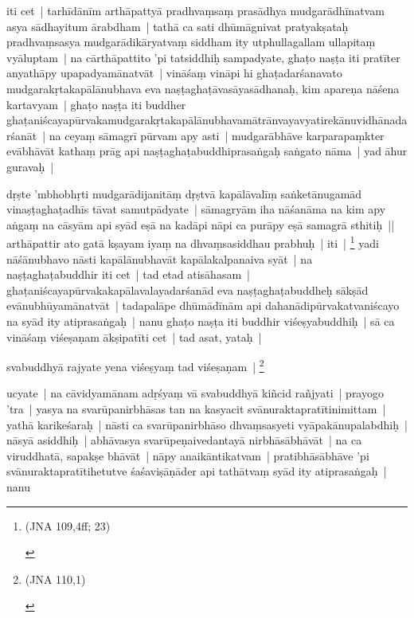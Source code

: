 \documentclass[article,a4paper]{memoir}
\begin{document}
	  \pstart iti cet | \label{thakur75-119.23} tarhī\-dā\-nī\-m arthā\-pattyā\- pradhvaṃsaṃ prasā\-dhya mudgarā\-dhī\-natvam asya sā\-dhayitum ā\-rabdham | tathā\- ca sati dhū\-mā\-gnivat pratyakṣataḥ pradhvaṃsasya mudgarā\-dikā\-ryatvaṃ siddham ity utphullagallam ullapitaṃ vyā\-luptam | \label{thakur75-119.26} na cā\-rthā\-pattito 'pi tatsiddhiḥ sampadyate, ghaṭo naṣṭa iti pratī\-ter anyathā\-py upapadyamā\-natvā\-t | vinā\-śaṃ vinā\-pi hi ghaṭadarśanavato mudgarakṛtakapā\-lā\-nubhava eva naṣṭaghaṭā\-vasā\-yasā\-dhanaḥ, kim apareṇa nā\-śena kartavyam | ghaṭo naṣṭa iti buddher ghaṭaniścayapū\-rvakamudgarakṛtakapā\-lā\-nubhavamā\-trā\-nvayavyatirekā\-nuvidhā\-nadarśanā\-t | \label{thakur75-119.29} na ceyaṃ sā\-magrī\- pū\-rvam apy asti | mudgarā\-bhā\-ve karparapaṃkter evā\-bhā\-vā\-t kathaṃ prā\-g api naṣṭaghaṭabuddhiprasaṅgaḥ saṅgato nā\-ma | \label{thakur75-119.31} yad ā\-hur guravaḥ |
	\pend
      

	  \pstart dṛṣte 'mbhobhṛti mudgarā\-dijanitā\-ṃ dṛṣtvā\- kapā\-lā\-valī\-ṃ saṅketā\-nugamā\-d vinaṣṭaghaṭadhī\-s tā\-vat samutpā\-dyate | sā\-magryā\-m iha nā\-śanā\-ma na kim apy aṅgaṃ na cā\-syā\-m api syā\-d eṣā\- na kadā\-pi nā\-pi ca purā\-py eṣā\- samagrā\- sthitiḥ || arthā\-pattir ato gatā\- kṣayam iyaṃ na dhvaṃsasiddhau prabhuḥ | iti | \footnote{\begin{english}(JNA 109,4ff; 23)\end{english}} \label{thakur75-120.4} yadi nā\-śā\-nubhavo nā\-sti kapā\-lā\-nubhavā\-t kapā\-lakalpanaiva syā\-t | na naṣṭaghaṭabuddhir iti cet | \label{thakur75-120.5} tad etad atisā\-hasam | ghaṭaniścayapū\-rvakakapā\-lavalayadarśanā\-d eva naṣṭaghaṭabuddheḥ sā\-kṣā\-d evā\-nubhū\-yamā\-natvā\-t | tadapalā\-pe dhū\-mā\-dī\-nā\-m api dahanā\-dipū\-rvakatvaniścayo na syā\-d ity atiprasaṅgaḥ | \label{thakur75-120.8} nanu ghaṭo naṣṭa iti buddhir viśeṣyabuddhiḥ | sā\- ca vinā\-śaṃ viśeṣaṇam ā\-kṣipatī\-ti cet | \label{thakur75-120.9} tad asat, yataḥ |
	\pend
      

	  \pstart svabuddhyā\- rajyate yena viśeṣyaṃ tad viśeṣaṇam | \footnote{\begin{english}(JNA 110,1)\end{english}}
	\pend
      

	  \pstart ucyate | na cā\-vidyamā\-nam adṛśyaṃ vā\- svabuddhyā\- kiñcid rañjyati | \label{thakur75-120.11} prayogo 'tra | yasya na svarū\-panirbhā\-sas tan na kasyacit svā\-nuraktapratī\-tinimittam | yathā\- karikeśaraḥ | nā\-sti ca svarū\-panirbhā\-so dhvaṃsasyeti vyā\-pakā\-nupalabdhiḥ | nā\-syā\- asiddhiḥ | abhā\-vasya svarū\-peṇaivedantayā\- nirbhā\-sā\-bhā\-vā\-t | na ca viruddhatā\-, sapakṣe bhā\-vā\-t | nā\-py anaikā\-ntikatvam | pratibhā\-sā\-bhā\-ve 'pi svā\-nuraktapratī\-tihetutve śaśaviṣā\-ṇā\-der api tathā\-tvaṃ syā\-d ity atiprasaṅgaḥ | \label{thakur75-120.17} nanu
	\pend
      
\end{document}
